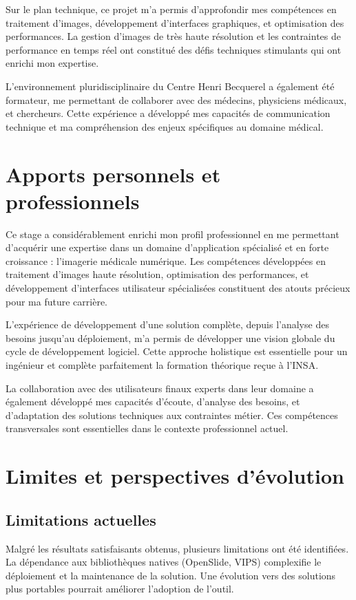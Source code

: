 \documentclass[12pt,a4paper]{report}
\begin{document}
\begin{}
\begin{}
\begin{}
\begin{}
Sur le plan technique, ce projet m'a permis d'approfondir mes compétences en traitement d'images, développement d'interfaces graphiques, et optimisation des performances. La gestion d'images de très haute résolution et les contraintes de performance en temps réel ont constitué des défis techniques stimulants qui ont enrichi mon expertise.

L'environnement pluridisciplinaire du Centre Henri Becquerel a également été formateur, me permettant de collaborer avec des médecins, physiciens médicaux, et chercheurs. Cette expérience a développé mes capacités de communication technique et ma compréhension des enjeux spécifiques au domaine médical.

\section{Apports personnels et professionnels}

Ce stage a considérablement enrichi mon profil professionnel en me permettant d'acquérir une expertise dans un domaine d'application spécialisé et en forte croissance : l'imagerie médicale numérique. Les compétences développées en traitement d'images haute résolution, optimisation des performances, et développement d'interfaces utilisateur spécialisées constituent des atouts précieux pour ma future carrière.

L'expérience de développement d'une solution complète, depuis l'analyse des besoins jusqu'au déploiement, m'a permis de développer une vision globale du cycle de développement logiciel. Cette approche holistique est essentielle pour un ingénieur et complète parfaitement la formation théorique reçue à l'INSA.

La collaboration avec des utilisateurs finaux experts dans leur domaine a également développé mes capacités d'écoute, d'analyse des besoins, et d'adaptation des solutions techniques aux contraintes métier. Ces compétences transversales sont essentielles dans le contexte professionnel actuel.

\section{Limites et perspectives d'évolution}

\subsection{Limitations actuelles}

Malgré les résultats satisfaisants obtenus, plusieurs limitations ont été identifiées. La dépendance aux bibliothèques natives (OpenSlide, VIPS) complexifie le déploiement et la maintenance de la solution. Une évolution vers des solutions plus portables pourrait améliorer l'adoption de l'outil.


\end{}
\end{}
\end{}
\end{}
\end{document}
